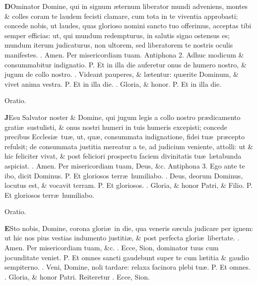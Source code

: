 \documentclass[letter,11pt]{book}
\makeatletter
\DeclareRobustCommand{\Vbar}{\vers@resp{-0.1em}{V}}
\DeclareRobustCommand{\Rbar}{\vers@resp{0pt}{R}}
\newcommand{\vers@resp@sym}{\raisebox{0.2ex}{\rotatebox[origin=c]{-20}{$\m@th\rceil$}}}
\newcommand{\vers@resp}[2]{%
  {\ooalign{\hidewidth\kern#1\vers@resp@sym\hidewidth\cr#2\cr}}%
}%
\def\P{\color{Red} P. \color{black}}
\def\V{\color{Red} \Vbar . \color{black}}
\def\R{\color{Red} \Rbar . \color{black}}
\makeatother
\begin{document}
\begin{multicols}{2}
\lettrine[lines=2]{\bfseries \color{Red} D}{}Ominator Domine, qui in signum \ae ternum liberator mundi adveniens, montes \& colles coram te laudem fecisti clamare, cum tota in te viventia approbasti; concede nobis, ut laudes, quas glorioso nomini sancto tuo offerimus, acceptas tibi semper efficias: ut, qui mundum redempturus, in salutis signo ostensus es; mundum iterum judicaturus, non ultorem, sed liberatorem te nostris oculis manifestes. \R Amen. Per misericordiam tuam.
\newline \color{Red} Antiphona 2. \color{black} Adhuc modicum \& consummabitur indignatio. \P Et in illa die auferetur onus de humero nostro, \& jugum de collo nostro. \V Videant pauperes, \& l\ae tentur: qu\ae rite Dominum, \& vivet anima vestra. \P Et in illa die. \V Gloria, \& honor. \P Et in illa die.
\vspace{-.75em} \begin{center} \color{Red} Oratio. \end{center} \vspace{-.75em}
\lettrine[lines=2]{\bfseries \color{Red} J}{}Esu Salvator noster \& Domine, qui jugum legis a collo nostro pr\ae dicamento grati\ae \ sustulisti, \& onus nostri humeri in tuis humeris excepisti; concede precibus Ecclesi\ae \ tu\ae , ut, qu\ae , consummata indignatione, fidei tu\ae \ pr\ae cepto refulsit; de consummata justitia mereatur a te, ad judicium
veniente, attolli: ut \& hic feliciter vivat, \& post feliciori prospectu faciem divinitatis tu\ae \ l\ae tabunda aspiciat. \R Amen. Per misericordiam tuam, Deus, \&c.
\newline \color{Red} Antiphona 3. \color{black} Ego ante te ibo, dicit Dominus. \P Et gloriosos terr\ae \ humiliabo. \V Deus, deorum Dominus, locutus est, \& vocavit terram. \P Et gloriosos. \V Gloria, \& honor Patri, \& Filio. \P Et gloriosos terr\ae \ humiliabo.
\vspace{-.75em} \begin{center} \color{Red} Oratio. \end{center} \vspace{-.75em}
\lettrine[lines=2]{\bfseries \color{Red} E}{}Sto nobis, Domine, corona glori\ae \ in die, qua veneris s\ae cula judicare per ignem: ut hic nos pius vestias indumento justiti\ae , \& post perfecta glori\ae \ libertate. \R Amen. Per misericordiam tuam, \&c.
\newline \R Ecce, Sion, dominator tuus cum jocunditate veniet. \P Et omnes sancti gaudebunt super te cum l\ae titia \& gaudio sempiterno. \V Veni, Domine, noli tardare: relaxa facinora plebi tu\ae . \P Et omnes. \V Gloria, \& honor Patri. \color{Red} Reiteretur \color{black} \R Ecce, Sion.

\end{multicols}
\end{document}
